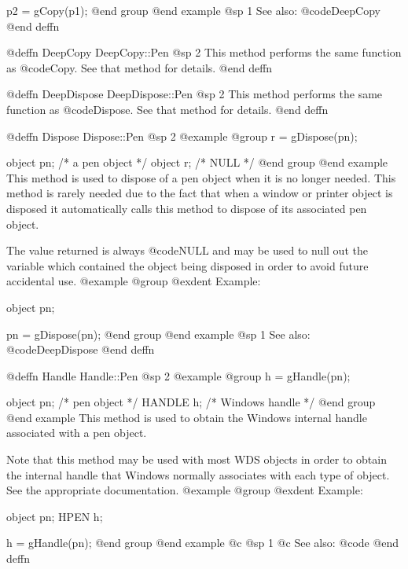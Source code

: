 p2 = gCopy(p1);
@end group
@end example
@sp 1
See also:  @code{DeepCopy}
@end deffn









@deffn {DeepCopy} DeepCopy::Pen
@sp 2
This method performs the same function as @code{Copy}.  See that
method for details.
@end deffn





@deffn {DeepDispose} DeepDispose::Pen
@sp 2
This method performs the same function as @code{Dispose}.  See that
method for details.
@end deffn







@deffn {Dispose} Dispose::Pen
@sp 2
@example
@group
r = gDispose(pn);

object  pn;   /*  a pen object  */
object  r;    /*  NULL          */
@end group
@end example
This method is used to dispose of a pen object when it is no longer
needed.  This method is rarely needed due to the fact that when a window
or printer object is disposed it automatically calls this method to
dispose of its associated pen object.

The value returned is always @code{NULL} and may be used to null out
the variable which contained the object being disposed in order to
avoid future accidental use.
@example
@group
@exdent Example:

object  pn;

pn = gDispose(pn);
@end group
@end example
@sp 1
See also:  @code{DeepDispose}
@end deffn






@deffn {Handle} Handle::Pen
@sp 2
@example
@group
h = gHandle(pn);

object  pn;     /*  pen object    */
HANDLE  h;      /*  Windows handle  */
@end group
@end example
This method is used to obtain the Windows internal handle associated with
a pen object.  

Note that this method may be used with most WDS objects in order to obtain
the internal handle that Windows normally associates with each type of object.
See the appropriate documentation.
@example
@group
@exdent Example:

object  pn;
HPEN    h;

h = gHandle(pn);
@end group
@end example
@c @sp 1
@c See also:  @code{}
@end deffn









